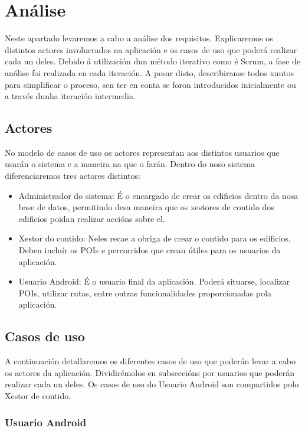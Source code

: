 \chapter{Análise}

Neste apartado levaremos a cabo a análise dos requisitos. Explicaremos os distintos actores involucrados na aplicación e os casos de uso que poderá realizar cada un deles. Debido á utilización dun método iterativo como é Scrum, a fase de análise foi realizada en cada iteración. A pesar disto, describiranse todos xuntos para simplificar o proceso, sen ter en conta se foron introducidos inicialmente ou a través dunha iteración intermedia.


\section{Actores}

No modelo de casos de uso os actores representan aos distintos usuarios que usarán o sistema e a maneira na que o farán. Dentro do noso sistema diferenciaremos tres actores distintos:

\begin{itemize}
	\item Administrador do sistema: É o encargado de crear os edificios dentro da nosa base de datos, permitindo desa maneira que os xestores de contido dos edificios poidan realizar accións sobre el.
	\item Xestor do contido: Neles recae a obriga de crear o contido para os edificios. Deben incluír os POIs e percorridos que crean útiles para os usuarios da aplicación.
	\item Usuario Android: É o usuario final da aplicación. Poderá situarse, localizar POIs, utilizar rutas, entre outras funcionalidades proporcionadas pola aplicación.
\end{itemize}


\section{Casos de uso}

A continuación detallaremos os diferentes casos de uso que poderán levar a cabo os actores da aplicación. Dividirémolos en subseccións por usuarios que poderán realizar cada un deles. Os casos de uso do Usuario Android son compartidos polo Xestor de contido.

\subsection{Usuario Android}

